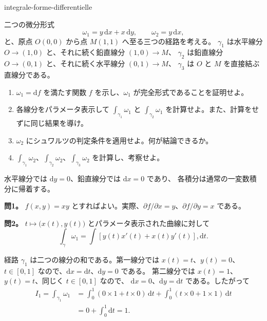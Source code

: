 
\begin{exo}[経路に沿った微分形式の積分]{integrale-forme-differentielle}

二つの微分形式
\[
\omega_1 = y\,\mathrm{d}x + x\,\mathrm{d}y,
\qquad
\omega_2 = y\,\mathrm{d}x,
\]
と、原点 $O(0,0)$ から点 $M(1,1)$ へ至る三つの経路を考える。
$\gamma_1$ は水平線分 $O\to(1,0)$ と、それに続く鉛直線分 $(1,0)\to M$、
$\gamma_2$ は鉛直線分 $O\to(0,1)$ と、それに続く水平線分 $(0,1)\to M$、
$\gamma_3$ は $O$ と $M$ を直接結ぶ直線分である。

\begin{enumerate}
\item $\omega_1 = \mathrm{d}f$ を満たす関数 $f$ を示し、$\omega_1$ が完全形式であることを証明せよ。
\item 各線分をパラメータ表示して $\int_{\gamma_1}\omega_1$ と $\int_{\gamma_2}\omega_1$ を計算せよ。また、計算をせずに同じ結果を導け。
\item $\omega_2$ にシュワルツの判定条件を適用せよ。何が結論できるか。
\item $\int_{\gamma_1}\omega_2$、$\int_{\gamma_2}\omega_2$、$\int_{\gamma_3}\omega_2$ を計算し、考察せよ。
\end{enumerate}

\begin{indication}
水平線分では $\mathrm{d}y = 0$、鉛直線分では $\mathrm{d}x = 0$ であり、
各積分は通常の一変数積分に帰着する。
\end{indication}

\begin{solution}
\textbf{問1。} $f(x,y) = xy$ とすればよい。実際、$\partial f/\partial x = y$、$\partial f/\partial y = x$ である。

\textbf{問2。} $t\mapsto\bigl(x(t),y(t)\bigr)$ とパラメータ表示された曲線に対して
\[
\int_\gamma\omega_1
= \int \left[y(t)x'(t)+x(t)y'(t)\right],\mathrm{d}t.
\]

経路 $\gamma_1$ は二つの線分の和である。第一線分では $x(t)=t$、$y(t)=0$、
$t\in[0,1]$ なので、$\mathrm{d}x=\mathrm{d}t$、$\mathrm{d}y=0$ である。
第二線分では $x(t)=1$、$y(t)=t$、同じく $t\in[0,1]$ なので、
$\mathrm{d}x=0$、$\mathrm{d}y=\mathrm{d}t$ である。したがって
\[
\begin{aligned}
I_1
= \int_{\gamma_1}\omega_1
&= \int_0^1\left(0\times 1+t\times 0\right)\,\mathrm{d}t
 + \int_0^1\left(t\times 0+1\times 1\right)\,\mathrm{d}t \\
&= 0+\int_0^1\mathrm{d}t = 1.
\end{aligned}
\]


\end{solution}
\end{exo}
